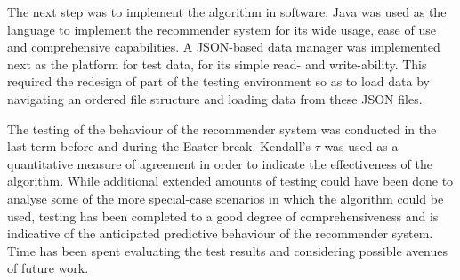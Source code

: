 The next step was to implement the algorithm in software. Java was used as the language to implement the recommender system for its wide usage, ease of use and comprehensive capabilities. A JSON-based data manager was implemented next as the platform for test data, for its simple read- and write-ability. This required the redesign of part of the testing environment so as to load data by navigating an ordered file structure and loading data from these JSON files.

The testing of the behaviour of the recommender system was conducted in the last term before and during the Easter break. Kendall's $\tau$ was used as a quantitative measure of agreement in order to indicate the effectiveness of the algorithm. While additional extended amounts of testing could have been done to analyse some of the more special-case scenarios in which the algorithm could be used, testing has been completed to a good degree of comprehensiveness and is indicative of the anticipated predictive behaviour of the recommender system. Time has been spent evaluating the test results and considering possible avenues of future work. 
